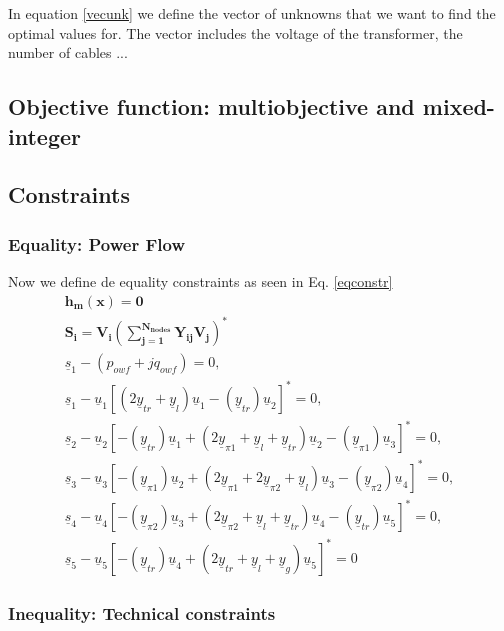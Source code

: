 \documentclass[a4paper,11pt, titlepage, twoside]{article}
\begin{document}
In equation \ref{vecunk} we define the vector of unknowns that we want to find the optimal values for. The vector includes the voltage of the transformer, the number of cables ...

\subsection{Objective function: multiobjective and mixed-integer}


\subsection{Constraints}
\subsubsection{Equality: Power Flow}

Now we define de equality constraints as seen in  Eq. \ref{eqconstr}
\begin{gather}
    \mathbf{h_m(x) = 0 } \label{eqconstr} \\
    \mathbf{S_i} = \mathbf{V_i(\sum_{j=1}^{N_{nodes}}Y_{ij}V_j)^*} \\
    \underline{s}_1-(p_{owf}+jq_{owf}) = 0, \nonumber \\
    \underline{s}_1-\underline{u}_1[(2\underline{y}_{tr}+\underline{y}_l)\underline{u}_1-(\underline{y}_{tr})\underline{u}_2]^* = 0, \nonumber \\
    \underline{s}_2-\underline{u}_2[-(\underline{y}_{tr})\underline{u}_1+(2\underline{y}_{\pi1}+\underline{y}_l+\underline{y}_{tr})\underline{u}_2-(\underline{y}_{\pi1})\underline{u}_3]^* = 0, \nonumber \\
    \underline{s}_3-\underline{u}_3[-(\underline{y}_{\pi1})\underline{u}_2+(2\underline{y}_{\pi1}+2\underline{y}_{\pi2}+\underline{y}_{l})\underline{u}_3-(\underline{y}_{\pi2})\underline{u}_4]^* = 0, \nonumber \\
    \underline{s}_4-\underline{u}_4[-(\underline{y}_{\pi2})\underline{u}_3+(2\underline{y}_{\pi2}+\underline{y}_l+\underline{y}_{tr})\underline{u}_4-(\underline{y}_{tr})\underline{u}_5]^* = 0, \nonumber \\
    \underline{s}_5-\underline{u}_5[-(\underline{y}_{tr})\underline{u}_4+(2\underline{y}_{tr}+\underline{y}_l+\underline{y}_{g})\underline{u}_5]^* = 0
\end{gather}

\newpage



\subsubsection{Inequality: Technical constraints}\label{inequality}
\end{document}
